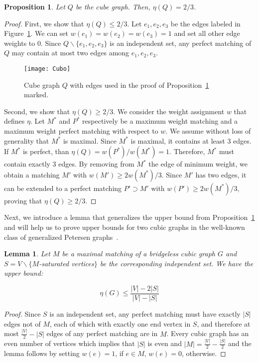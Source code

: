 \documentclass{article}
\newtheorem{lem}[thm]{Lemma}
\newtheorem{proposition}[thm]{Proposition}
\begin{document}
\begin{proposition} \label{prop:cube}
Let $Q$ be the cube graph. Then, $\eta(Q) = 2/3$.
\end{proposition}
\begin{proof}
First, we show that $\eta(Q) \leq 2/3$. Let $e_1,e_2,e_3$ be the edges labeled in Figure~\ref{fig:cube}. We can set $w(e_1)=w(e_2)=w(e_3)=1$ and set all other edge weights to $0$. 
Since $Q\smallsetminus \{e_1,e_2,e_3\}$ is an independent set, any perfect matching of $Q$ may contain at most two edges among $e_1,e_2,e_3$.

\begin{figure}[ht]
\centering
\texttt{[image: Cubo]}
\caption{Cube graph $Q$ with edges used in the proof of Proposition~\ref{prop:cube} marked.
}
\label{fig:cube}
\end{figure}

Second, we show that $\eta(Q) \geq 2/3$. We consider the weight assignment $w$ that defines $\eta$. Let $M^*$ and $P^*$ respectively be a maximum weight matching and a maximum weight perfect matching with respect to $w$. We assume without loss of generality that $M^*$ is maximal. Since $M^*$ is maximal, it contains at least $3$ edges. If $M^*$ is perfect, than $\eta(Q) = w(P^*)/w(M^*) = 1$. Therefore, $M^*$ must contain exactly $3$ edges. By removing from $M^*$ the edge of minimum weight, we obtain a matching $M'$ with $w(M') \geq 2 w(M^*)/3$. Since $M'$ has two edges, it can be extended to a perfect matching $P' \supset M'$ with $w(P') \geq 2 w(M^*)/3$, proving that $\eta(Q) \geq 2/3$.
\end{proof}

Next, we introduce a lemma that generalizes the upper bound from Proposition~\ref{prop:cube} and will help us to prove upper bounds for two cubic graphs in the well-known class of generalized Petersen graphs~\cite{Watkins_gen}.

\begin{lem}\label{maxmatchings}
Let $M$ be a maximal matching of a bridgeless cubic graph $G$ and $S=V \smallsetminus \{M$-saturated vertices$\}$ be the corresponding independent set. We have the upper bound:

$$\eta(G)\leq \frac{\left|V\right|-2|S|}{|V|-|S|}$$
\end{lem}
\begin{proof}
Since $S$ is an independent set, any perfect matching must have exactly $|S|$ edges not of $M$, each of which with exactly one end vertex in $S$, and therefore at most $\frac{|V|}{2}-|S|$ edges of any perfect matching are in $M$. Every cubic graph has an even number of vertices which implies that $|S|$ is even and $|M|=\frac{|V|}{2}-\frac{|S|}{2}$ and the lemma follows by setting $w(e)=1$, if $e \in M$, $w(e)=0$, otherwise.
\end{proof}
\end{document}
